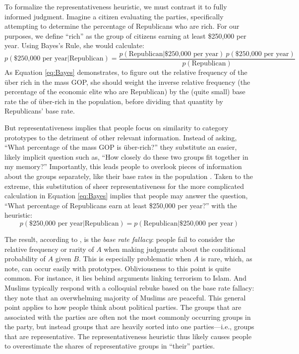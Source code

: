\documentclass[12pt, letterpaper]{article}
\begin{document}
To formalize the representativeness heuristic, we must contrast it to fully informed judgment. Imagine a citizen evaluating the parties, specifically attempting to determine the percentage of Republicans who are rich. For our purposes, we define ``rich'' as the group of citizens earning at least \$250,000 per year. Using Bayes's Rule, she would calculate:
\begin{equation} \label{eq:Bayes}
p(\text{\$250,000 per year} | \text{Republican}) = \frac{p(\text{Republican} | \text{\$250,000 per year}) \: p(\text{\$250,000 per year})}{p(\text{Republican})}
\end{equation}
As Equation \ref{eq:Bayes} demonstrates, to figure out the relative frequency of the \"{u}ber rich in the mass GOP, she should weight the inverse relative frequency (the percentage of the economic elite who are Republican) by the (quite small) base rate the of \"{u}ber-rich in the population, before dividing that quantity by Republicans' base rate. 

But representativeness implies that people focus on similarity to category prototypes to the detriment of other relevant information. Instead of asking, ``What percentage of the mass GOP is \"{u}ber-rich?'' they substitute an easier, likely implicit question such as, ``How closely do these two groups fit together in my memory?'' Importantly, this leads people to overlook pieces of information about the groups separately, like their base rates in the population \citep{KahnemanFrederick2002}. Taken to the extreme, this substitution of sheer representativeness for the more complicated calculation in Equation \ref{eq:Bayes}  implies that people may answer the question, ``What percentage of Republicans earn at least \$250,000 per year?'' with the heuristic:
\begin{equation} \label{eq:rep}
p(\text{\$250,000 per year} | \text{Republican}) = p(\text{Republican} | \text{\$250,000 per year})
\end{equation}

The result, according to \citet{TverskyKahneman1973}, is the \emph{base rate fallacy}: people fail to consider the relative frequency or rarity of $A$ when making judgments about the conditional probability of $A$ given $B$. This is especially problematic when $A$ is rare, which, as \citet{RoschMervis1975} note, can occur easily with prototypes. Obliviousness to this point is quite common. For instance, it lies behind arguments linking terrorism to Islam. And Muslims typically respond with a colloquial rebuke based on the base rate fallacy: they note that an overwhelming majority of Muslims are peaceful. This general point applies to how people think about political parties. The groups that are associated with the parties are often not the most commonly occurring groups in the party, but instead groups that are heavily sorted into one parties---i.e., groups that are representative. The representativeness heuristic thus likely causes people to overestimate the shares of representative groups in ``their'' parties. 
\end{document}

